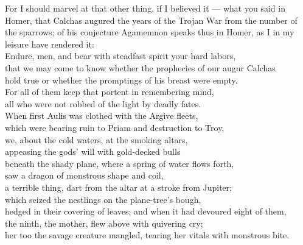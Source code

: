  For I should marvel at that other thing, if I believed it — what you said in Homer, that Calchas augured the years of the Trojan War from the number of the sparrows; of his conjecture Agamemnon speaks thus in Homer, as I in my leisure have rendered it: \\
Endure, men, and bear with steadfast spirit your hard labors, \\
that we may come to know whether the prophecies of our augur Calchas \\
hold true or whether the promptings of his breast were empty. \\
For all of them keep that portent in remembering mind, \\
all who were not robbed of the light by deadly fates. \\
When first Aulis was clothed with the Argive fleets, \\
which were bearing ruin to Priam and destruction to Troy, \\
we, about the cold waters, at the smoking altars, \\
appeasing the gods' will with gold-decked bulls \\
beneath the shady plane, where a spring of water flows forth, \\
saw a dragon of monstrous shape and coil, \\
a terrible thing, dart from the altar at a stroke from Jupiter; \\
which seized the nestlings on the plane-tree's bough, \\
hedged in their covering of leaves; and when it had devoured eight of them, \\
the ninth, the mother, flew above with quivering cry; \\
her too the savage creature mangled, tearing her vitals with monstrous bite.

